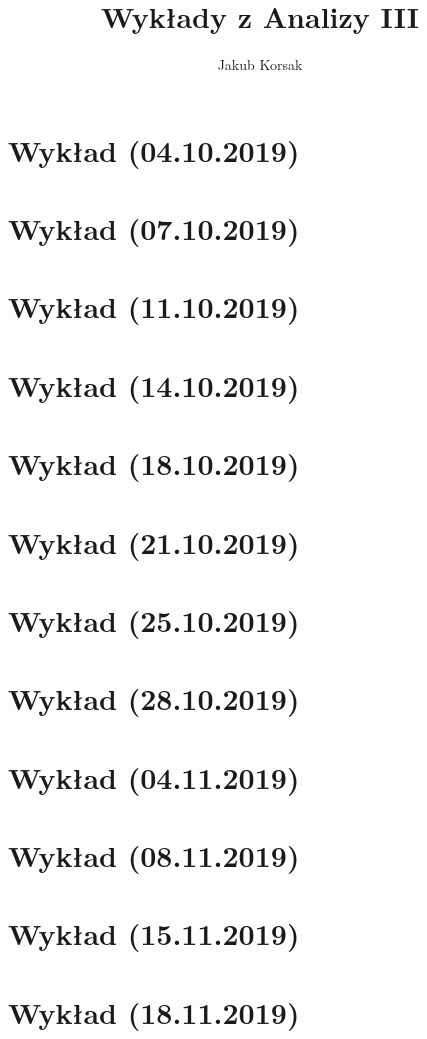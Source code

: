 \documentclass[a4]{article}
\title{Wykłady z Analizy III}
\author{Jakub Korsak}
\date{}
\begin{document}
\maketitle

\pagebreak
\section{Wykład (04.10.2019)}

\pagebreak
\section{Wykład (07.10.2019)}

\pagebreak
\section{Wykład (11.10.2019)}

\pagebreak
\section{Wykład (14.10.2019)}

\pagebreak
\section{Wykład (18.10.2019)}

\pagebreak
\section{Wykład (21.10.2019)}

\pagebreak
\section{Wykład (25.10.2019)}

\pagebreak
\section{Wykład (28.10.2019)}

\pagebreak
\section{Wykład (04.11.2019)}

\pagebreak
\section{Wykład (08.11.2019)}

\pagebreak
\section{Wykład (15.11.2019)}

\pagebreak
\section{Wykład (18.11.2019)}

\end{document}
